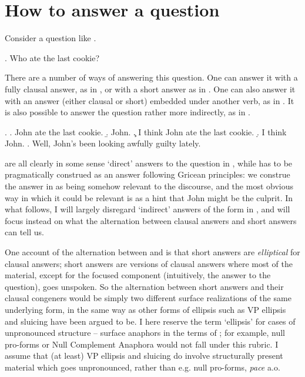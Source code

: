 \documentclass[doublespace]{umthesis}
\begin{document}
\renewcommand{\firstrefdash}{}


\section{How to answer a question}

Consider a question like \Next.

\ex. Who ate the last cookie?

There are a number of ways of answering this question. One can answer it with a fully clausal answer, as in \Next[a], or with a short answer as in \Next[b]. One can also answer it with an answer (either clausal or short) embedded under another verb, as in \Next[c, d]. It is also possible to answer the question rather more indirectly, as in \Next[e].

\ex. 		\a. John ate the last cookie.
		\b. John.
		\c. I think John ate the last cookie.
		\d. I think John.
		\e. Well, John's been looking awfully guilty lately.
		
\Last[a--d] are all clearly in some sense `direct' answers to the question in \LLast, while \Last[e] has to be pragmatically construed as an answer following Gricean principles: we construe the answer in \Last[e] as being somehow relevant to the discourse, and the most obvious way in which it could be relevant is as a hint that John might be the culprit. In what follows, I will largely disregard `indirect' answers of the form in \Last[e], and will focus instead on what the alternation between clausal answers \Last[a, c] and short answers \Last[b, d] can tell us.

One account of the alternation between \Last[a, c] and \Last[b, d] is that short answers are \emph{elliptical} for clausal answers; short answers are versions of clausal answers where most of the material, except for the focused component (intuitively, the answer to the question), goes unspoken. So the alternation between short answers and their clausal congeners would be simply two different surface realizations of the same underlying form, in the same way as other forms of ellipsis such as VP ellipsis \Next[b] and sluicing \Next[c] have been argued to be. I here reserve the term `ellipsis' for cases of unpronounced structure -- surface anaphors in the terms of \cite{HS76}; for example, null pro-forms or Null Complement Anaphora would not fall under this rubric. I assume that (at least) VP ellipsis and sluicing do involve structurally present material which goes unpronounced, rather than e.g. null pro-forms, {\it pace} \cite{Ch87, Lo95} a.o.
\end{document}
